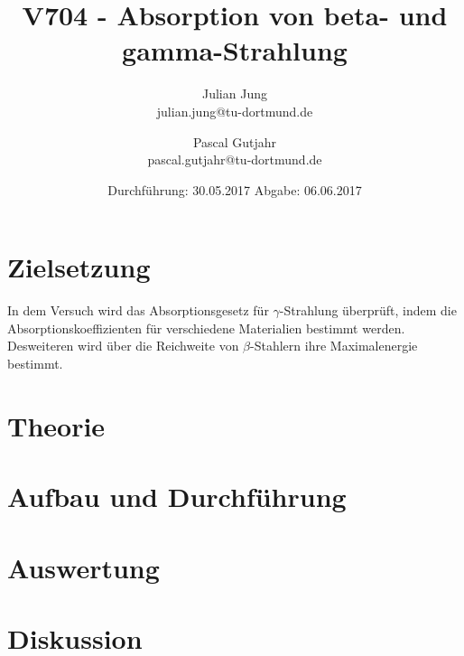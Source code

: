 

\title{V704 - Absorption von beta- und gamma-Strahlung}
\author{Julian Jung \\ julian.jung@tu-dortmund.de
  \and Pascal Gutjahr \\ pascal.gutjahr@tu-dortmund.de}
  \date{Durchführung: 30.05.2017
  \hspace{3em}
  Abgabe: 06.06.2017}
  
\maketitle
\newpage
\tableofcontents
\newpage
\section{Zielsetzung}
In dem Versuch wird das Absorptionsgesetz für $\gamma$-Strahlung überprüft,
indem die Absorptionskoeffizienten für verschiedene Materialien bestimmt werden.
Desweiteren wird über die Reichweite von $\beta$-Stahlern ihre Maximalenergie
bestimmt.
\section{Theorie}
 
\section{Aufbau und Durchführung}
 
\section{Auswertung}
 
\section{Diskussion}

\printbibliography

